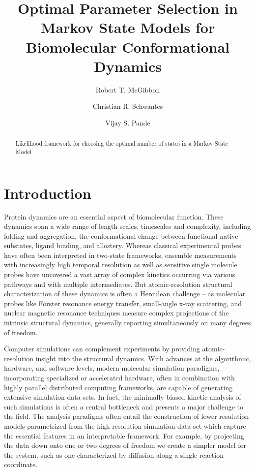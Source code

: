 \documentclass[twocolumn,floatfix,nofootinbib,aps]{revtex4-1}
\begin{document}
\title{Optimal Parameter Selection in Markov State Models for Biomolecular Conformational Dynamics}
\author{Robert T. McGibbon}
\author{Christian R. Schwantes}
\author{Vijay S. Pande}

\begin{abstract}
Likelihood framework for choosing the optimal number of states in a
Markov State Model
\end{abstract}

\maketitle

\section{Introduction}
Protein dynamics are an essential aspect of biomolecular function. These dynamics span a wide range of length scales, timescales and complexity, including folding and aggregation, the conformational change between functional native substates, ligand binding, and allostery. Whereas classical experimental probes have often been interpreted in two-state frameworks, ensemble measurements with increasingly high temporal resolution as well as sensitive single molecule probes have uncovered a vast array of complex kinetics occurring via various pathways and with multiple intermediates. But atomic-resolution structural characterization of these dynamics is often a Herculean challenge -- as molecular probes like F\"{o}rster resonance energy transfer, small-angle x-ray scattering, and nuclear magnetic resonance techniques measure complex projections of the intrinsic structural dynamics, generally reporting simultaneously on many degrees of freedom.

Computer simulations can complement experiments by providing atomic-resolution insight into the structural dynamics. With advances at the algorithmic, hardware, and software levels, modern molecular simulation paradigms, incorporating specialized or accelerated hardware, often in combination with highly parallel distributed computing frameworks, are capable of generating extensive simulation data sets. In fact, the minimally-biased kinetic analysis of such simulations is often a central bottleneck and presents a major challenge to the field. The analysis paradigms often entail the construction of lower resolution models parametrized from the high resolution simulation data set which capture the essential features in an interpretable framework. For example, by projecting the data down onto one or two degrees of freedom we create a simpler model for the system, such as one characterized by diffusion along a single reaction coordinate.
\end{document}

